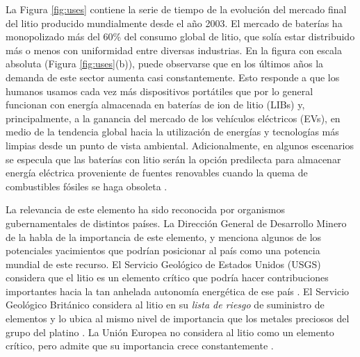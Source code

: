 La Figura \ref{fig:uses} contiene la serie de tiempo de la evolución del mercado final del litio producido mundialmente desde el año 2003. El mercado de baterías ha monopolizado más del 60\% del consumo global de litio, que solía estar distribuido más o menos con uniformidad entre diversas industrias. En la figura con escala absoluta (Figura \ref{fig:uses}(b)), puede observarse que en los últimos años la demanda de este sector aumenta casi constantemente. Esto responde a que los humanos usamos cada vez más dispositivos portátiles que por lo general funcionan con energía almacenada en baterías de ion de litio (LIBs) y, principalmente, a la ganancia del mercado de los vehículos eléctricos (EVs), en medio de la tendencia global hacia la utilización de energías y tecnologías más limpias desde un punto de vista ambiental. Adicionalmente, en algunos escenarios se especula que las baterías con litio serán la opción predilecta para almacenar energía eléctrica proveniente de fuentes renovables cuando la quema de combustibles fósiles se haga obsoleta \citep{SVERDRUP2016}.

La relevancia de este elemento ha sido reconocida por organismos gubernamentales de distintos países. La Dirección General de Desarrollo Minero de la \citet{SecEc2018} habla de la importancia de este elemento, y menciona algunos de los potenciales yacimientos que podrían posicionar al país como una potencia mundial de este recurso. El Servicio Geológico de Estados Unidos (USGS) considera que el litio es un elemento crítico que podría hacer contribuciones importantes hacia la tan anhelada autonomía energética de ese país \citep{Bradley2017}. El Servicio Geológico Británico considera al litio en su \textit{lista de riesgo} de suministro de elementos y lo ubica al mismo nivel de importancia que los metales preciosos del grupo del platino \citep{STERBA2019416}. La Unión Europea no considera al litio como un elemento crítico, pero admite que su importancia crece constantemente \citep{European2018}.


